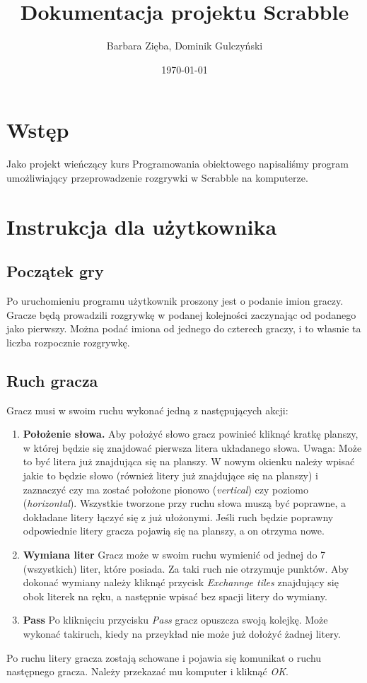 \documentclass[a4paper]{article}
\author{Barbara Zięba, Dominik Gulczyński}
\title{Dokumentacja projektu Scrabble}
\date{\today}
\begin{document}
\maketitle
\section{Wstęp}
Jako projekt wieńczący kurs Programowania obiektowego napisaliśmy
program umożliwiający przeprowadzenie rozgrywki w Scrabble na
komputerze.
\section{Instrukcja dla użytkownika}
\subsection{Początek gry}
Po uruchomieniu programu użytkownik proszony jest o podanie imion graczy. Gracze będą prowadzili rozgrywkę w podanej kolejności zaczynając od podanego jako pierwszy. Można podać imiona od jednego do czterech graczy, i to własnie ta liczba rozpocznie rozgrywkę.
\subsection{Ruch gracza}
Gracz musi w swoim ruchu wykonać jedną z następujących akcji:
\begin{enumerate}
\item[] \textbf{Położenie słowa.} Aby położyć słowo gracz powinieć kliknąć kratkę planszy, w której będzie się znajdować pierwsza litera układanego słowa. Uwaga: Może to być litera już znajdująca się na planszy.
W nowym okienku należy wpisać jakie to będzie słowo (również litery już znajdujące się na planszy) i zaznaczyć czy ma zostać położone pionowo (\textit{vertical}) czy poziomo (\textit{horizontal}). Wszystkie tworzone przy ruchu słowa muszą być poprawne, a dokładane litery łączyć się z już ułożonymi. Jeśli ruch będzie poprawny odpowiednie litery gracza pojawią się na planszy, a on otrzyma nowe.
\item[] \textbf{Wymiana liter} Gracz może w swoim ruchu wymienić od jednej do 7 (wszystkich) liter, które posiada. Za taki ruch nie otrzymuje punktów. Aby dokonać wymiany należy kliknąć przycisk \textit{Exchannge tiles} znajdujący się obok literek na ręku, a następnie wpisać bez spacji litery do wymiany.
\item[] \textbf{Pass} Po kliknięciu przycisku \textit{Pass} gracz opuszcza swoją kolejkę. Może wykonać takiruch, kiedy na przeykład nie może już dołożyć żadnej litery.
\end{enumerate}
Po ruchu litery gracza zostają schowane i pojawia się komunikat o ruchu następnego gracza. Należy przekazać mu komputer i kliknąć \textit{OK}.
\end{document}
